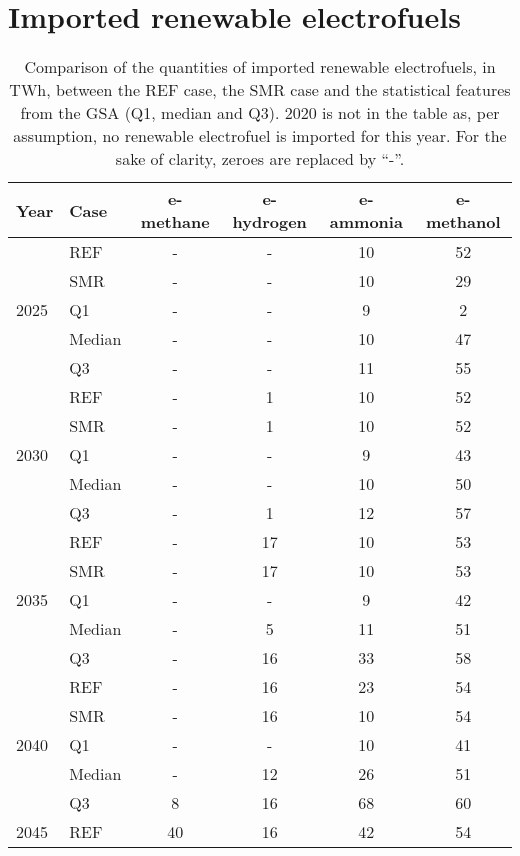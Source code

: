 \section{Imported renewable electrofuels}
\label{app:UQ_electrofuels}
\begin{table}[htbp!]
\caption{Comparison of the quantities of imported renewable electrofuels, in TWh, between the REF case, the SMR case and the statistical features from the \gls{GSA} (\ie Q1, median and Q3). 2020 is not in the table as, per assumption, no renewable electrofuel is imported for this year. For the sake of clarity, zeroes are replaced by ``-''.}
\label{tab:uq_ref_smr_med}
\begin{minipage}{\linewidth}
\centering
\begin{tabular}{l l | c c c c}
\toprule
\textbf{Year} & \textbf{Case} & \textbf{e-methane} & \textbf{e-hydrogen} & \textbf{e-ammonia} & \textbf{e-methanol}\\	
\toprule							
\multirow{5}{*}{2025}
 & REF & - & - & 10 & 52\\
 & SMR & - & -  & 10 & 29\\
 \cmidrule{2 - 6}
 & Q1 & - & - & 9 & 2\\
 & Median & - & - & 10 & 47\\
 & Q3 & - & - & 11 & 55\\
\toprule
\multirow{5}{*}{2030}
 & REF & - & 1 & 10 & 52\\
 & SMR & - & 1 & 10 & 52\\
 \cmidrule{2 - 6}
 & Q1 & - & - & 9 & 43\\
 & Median & - & - & 10 & 50\\
 & Q3 & - & 1 & 12 & 57\\
\toprule
\multirow{5}{*}{2035}
 & REF & - & 17 & 10 & 53\\
 & SMR & - & 17 & 10 & 53\\
 \cmidrule{2 - 6}
 & Q1 & - & - & 9 & 42\\
 & Median & - & 5 & 11 & 51\\
 & Q3 & - & 16 & 33 & 58\\
\toprule
\multirow{5}{*}{2040}
 & REF & - & 16 & 23 & 54\\
 & SMR & - & 16 & 10 & 54\\
 \cmidrule{2 - 6}
 & Q1 & - & - & 10 & 41\\
 & Median & - & 12 & 26 & 51\\
 & Q3 & 8 & 16 & 68 & 60\\
\toprule
\multirow{5}{*}{2045}
 & REF & 40 & 16 & 42 & 54\\

\end{tabular}
\end{minipage}
\end{table}
